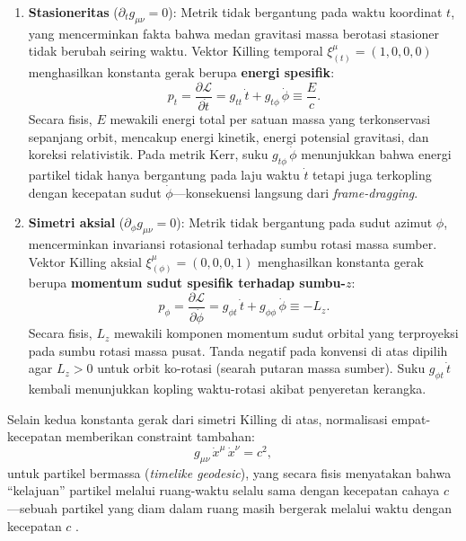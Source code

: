 \begin{enumerate}[label=(\roman*)]
    \item \textbf{Stasioneritas} ($\partial_t g_{\mu\nu} = 0$): Metrik tidak bergantung pada waktu koordinat $t$, yang mencerminkan fakta bahwa medan gravitasi massa berotasi stasioner tidak berubah seiring waktu. Vektor Killing temporal $\xi^\mu_{(t)} = (1, 0, 0, 0)$ menghasilkan konstanta gerak berupa \textbf{energi spesifik}:
    \begin{equation}
        p_t = \frac{\partial\mathcal{L}}{\partial\dot{t}} = g_{tt}\,\dot{t} + g_{t\phi}\,\dot{\phi} \equiv \frac{E}{c}.
        \label{eq:const-E}
    \end{equation}
    Secara fisis, $E$ mewakili energi total per satuan massa yang terkonservasi sepanjang orbit, mencakup energi kinetik, energi potensial gravitasi, dan koreksi relativistik. Pada metrik Kerr, suku $g_{t\phi}\,\dot{\phi}$ menunjukkan bahwa energi partikel tidak hanya bergantung pada laju waktu $\dot{t}$ tetapi juga terkopling dengan kecepatan sudut $\dot{\phi}$---konsekuensi langsung dari \textit{frame-dragging}.

    \item \textbf{Simetri aksial} ($\partial_\phi g_{\mu\nu} = 0$): Metrik tidak bergantung pada sudut azimut $\phi$, mencerminkan invariansi rotasional terhadap sumbu rotasi massa sumber. Vektor Killing aksial $\xi^\mu_{(\phi)} = (0, 0, 0, 1)$ menghasilkan konstanta gerak berupa \textbf{momentum sudut spesifik terhadap sumbu-$z$}:
    \begin{equation}
        p_\phi = \frac{\partial\mathcal{L}}{\partial\dot{\phi}} = g_{\phi t}\,\dot{t} + g_{\phi\phi}\,\dot{\phi} \equiv -L_z.
        \label{eq:const-Lz}
    \end{equation}
    Secara fisis, $L_z$ mewakili komponen momentum sudut orbital yang terproyeksi pada sumbu rotasi massa pusat. Tanda negatif pada konvensi di atas dipilih agar $L_z > 0$ untuk orbit ko-rotasi (searah putaran massa sumber). Suku $g_{\phi t}\,\dot{t}$ kembali menunjukkan kopling waktu-rotasi akibat penyeretan kerangka.
\end{enumerate}

Selain kedua konstanta gerak dari simetri Killing di atas, normalisasi empat-kecepatan memberikan constraint tambahan:
\begin{equation}
    g_{\mu\nu}\,\dot{x}^\mu\,\dot{x}^\nu = c^2,
    \label{eq:normalisasi}
\end{equation}
untuk partikel bermassa (\textit{timelike geodesic}), yang secara fisis menyatakan bahwa ``kelajuan'' partikel melalui ruang-waktu selalu sama dengan kecepatan cahaya $c$---sebuah partikel yang diam dalam ruang masih bergerak melalui waktu dengan kecepatan $c$ \parencite{Carroll2004SpacetimeGeometry, Schutz2009FirstCourse}.

